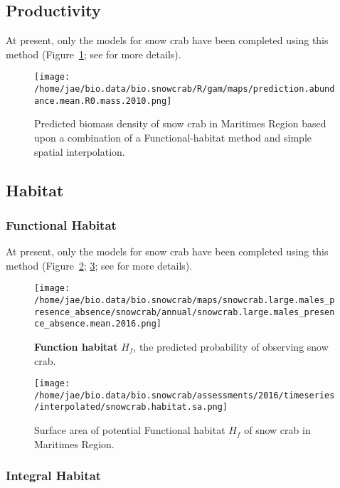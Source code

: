 \documentclass[letterpaper,portrait,11pt]{scrartcl}
\numberwithin{equation}{section}    %
\numberwithin{figure}{section}    %
\numberwithin{table}{section}       %
\begin{document}
\subsection{Productivity}
At present, only the models for snow crab have been completed using this method (Figure~\ref{fig:snowcrabAbundance}; see \cite{choi:2012:resdoc} for more details). 



\begin{figure}
  \label{fig:snowcrabAbundance}
  \centering
  \texttt{[image: /home/jae/bio.data/bio.snowcrab/R/gam/maps/prediction.abundance.mean.R0.mass.2010.png]}
  \caption{Predicted biomass density of snow crab in Maritimes Region based upon a combination of a Functional-habitat method and simple spatial interpolation.}
\end{figure}

\subsection{Habitat}

\subsubsection{Functional Habitat}

At present, only the models for snow crab have been completed using this method (Figure~\ref{fig:snowcrabHabitat}; \ref{fig:snowcrabHabitatTS}; see \cite{choi:2012:resdoc} for more details). 

\begin{figure}[h]
  \label{fig:snowcrabHabitat}
  \centering
  \texttt{[image: /home/jae/bio.data/bio.snowcrab/maps/snowcrab.large.males\_presence\_absence/snowcrab/annual/snowcrab.large.males\_presence\_absence.mean.2016.png]}
  \caption{\textbf{Function habitat} $H_f$, the predicted probability of observing snow crab.}
\end{figure}      

\begin{figure}[h]
  \label{fig:snowcrabHabitatTS}
  \centering
  \texttt{[image: /home/jae/bio.data/bio.snowcrab/assessments/2016/timeseries/interpolated/snowcrab.habitat.sa.png]}
  \caption{Surface area of potential Functional habitat $H_f$ of snow crab in Maritimes Region.}
\end{figure}


\afterpage{\clearpage}
\subsubsection{Integral Habitat}
\end{document}
